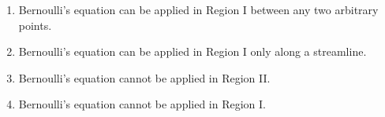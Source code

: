 \documentclass[journal,12pt,onecolumn]{IEEEtran}
\theoremstyle{remark}
\begin{document}
\begin{enumerate}
\begin{center}

\end{center}

\begin{enumerate}
    \item Bernoulli's equation can be applied in Region I between any two arbitrary points.
    \item Bernoulli's equation can be applied in Region I only along a streamline.
    \item Bernoulli's equation cannot be applied in Region II.
    \item Bernoulli's equation cannot be applied in Region I.
\end{enumerate}
\end{enumerate}
\end{document}
